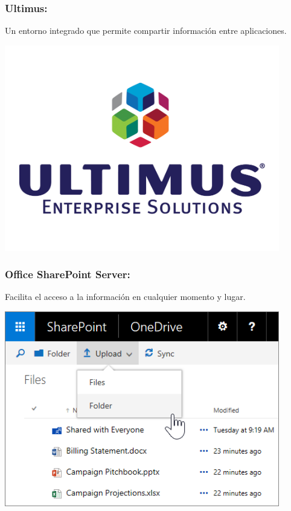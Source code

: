 \subsubsection{Ultimus: }\label{sec:nada2}  
Un entorno integrado que permite compartir información entre aplicaciones.
	\begin{center}
	\includegraphics[width=12cm]{./Imagenes/BIimagen4}
	\end{center}
	
\subsubsection{Office SharePoint Server: }\label{sec:nada2}  
Facilita el acceso a la información en cualquier momento y lugar.
	\begin{center}
	\includegraphics[width=12cm]{./Imagenes/BIimagen5}
	\end{center}
	
